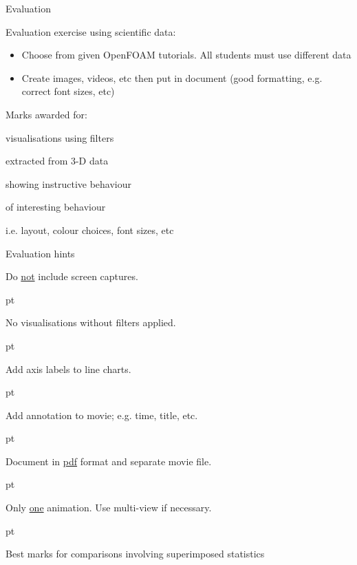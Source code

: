 \documentclass{beamer}
\begin{document}
\begin{frame}{Evaluation}
    
Evaluation exercise using scientific data:
\begin{itemize}
    \item Choose from given OpenFOAM tutorials. All students must use different data
    \item Create images, videos, etc then put in document (good formatting, e.g. correct font sizes, etc)
\end{itemize}{}
    
    Marks awarded for:
    \begin{description}{}
        \item[3-D] visualisations using filters %
        \item[Line plots] extracted from 3-D data %
        \item[Animation] showing instructive behaviour %
        \item[Description] of interesting behaviour %
        \item[Formatting] i.e. layout, colour choices, font sizes, etc %
    \end{description}
    
\end{frame}{}

\begin{frame}{Evaluation hints}

Do \underline{not} include screen captures.

 pt

No visualisations without filters applied.

 pt

Add axis labels to line charts.

 pt

Add annotation to movie; e.g. time, title, etc.

 pt

Document in \underline{pdf} format and separate movie file.

 pt

Only \underline{one} animation. Use multi-view if necessary.

 pt

Best marks for comparisons involving superimposed statistics

\end{frame}{}

    

    

    

    
\end{document}
